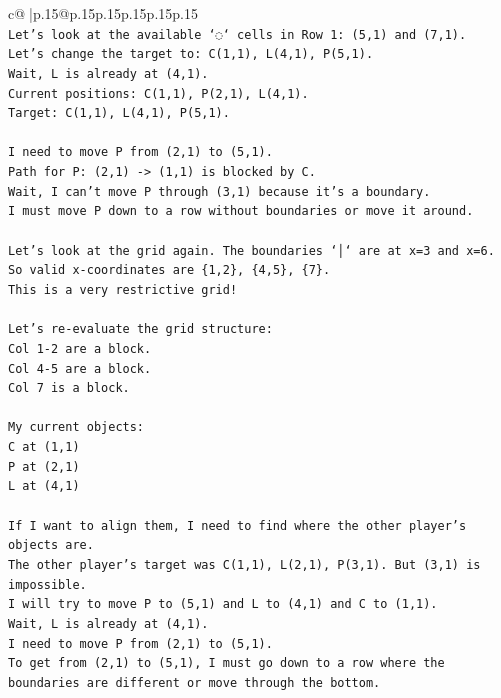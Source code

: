 \documentclass{article}
\begin{document}
{\begin{supertabular}{c@{$\;$}|p{.15\linewidth}@{}p{.15\linewidth}p{.15\linewidth}p{.15\linewidth}p{.15\linewidth}p{.15\linewidth}}
{{{\\ 
\texttt{Let's look at the available `◌` cells in Row 1: (5,1) and (7,1).} \\
\texttt{Let's change the target to: C(1,1), L(4,1), P(5,1).} \\
\texttt{Wait, L is already at (4,1).} \\
\texttt{Current positions: C(1,1), P(2,1), L(4,1).} \\
\texttt{Target: C(1,1), L(4,1), P(5,1).} \\
\\ 
\texttt{I need to move P from (2,1) to (5,1).} \\
\texttt{Path for P: (2,1) {-}> (1,1) is blocked by C.} \\
\texttt{Wait, I can't move P through (3,1) because it's a boundary.} \\
\texttt{I must move P down to a row without boundaries or move it around.} \\
\\ 
\texttt{Let's look at the grid again. The boundaries `│` are at x=3 and x=6.} \\
\texttt{So valid x{-}coordinates are \{1,2\}, \{4,5\}, \{7\}.} \\
\texttt{This is a very restrictive grid!} \\
\\ 
\texttt{Let's re{-}evaluate the grid structure:} \\
\texttt{Col 1{-}2 are a block.} \\
\texttt{Col 4{-}5 are a block.} \\
\texttt{Col 7 is a block.} \\
\\ 
\texttt{My current objects:} \\
\texttt{C at (1,1)} \\
\texttt{P at (2,1)} \\
\texttt{L at (4,1)} \\
\\ 
\texttt{If I want to align them, I need to find where the other player's objects are.} \\
\texttt{The other player's target was C(1,1), L(2,1), P(3,1). But (3,1) is impossible.} \\
\texttt{I will try to move P to (5,1) and L to (4,1) and C to (1,1).} \\
\texttt{Wait, L is already at (4,1).} \\
\texttt{I need to move P from (2,1) to (5,1).} \\
\texttt{To get from (2,1) to (5,1), I must go down to a row where the boundaries are different or move through the bottom.} \\
}}}
\end{supertabular}}
\end{document}
